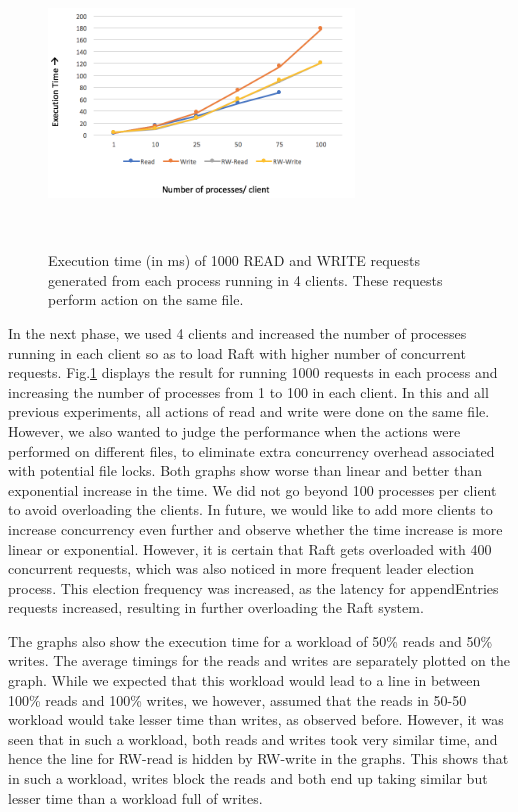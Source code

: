 \begin{figure}
\centering
\includegraphics[height=2in, width=3.2in]{images/F-VHC-SF.png}
\caption{Execution time (in ms) of 1000 READ and WRITE requests generated from each process running in 4 clients. These requests perform action on the same file.}~\label{fig:figure5}
\end{figure}

In the next phase, we used 4 clients and increased the number of processes running in each client so as to load Raft with higher number of concurrent requests. Fig.\ref{fig:figure5} displays the result for running 1000 requests in each process and increasing the number of processes from 1 to 100 in each client. In this and all previous experiments, all actions of read and write were done on the same file. However, we also wanted to judge the performance when the actions were performed on different files, to eliminate extra concurrency overhead associated with potential file locks. Both graphs show worse than linear and better than exponential increase in the time. We did not go beyond 100 processes per client to avoid overloading the clients. In future, we would like to add more clients to increase concurrency even further and observe whether the time increase is more linear or exponential. However, it is certain that Raft gets overloaded with 400 concurrent requests, which was also noticed in more frequent leader election process. This election frequency was increased, as the latency for appendEntries requests increased, resulting in further overloading the Raft system. 

The graphs also show the execution time for a workload of 50\% reads and 50\% writes. The average timings for the reads and writes are separately plotted on the graph. While we expected that this workload would lead to a line in between 100\% reads and 100\% writes, we however, assumed that the reads in 50-50 workload would take lesser time than writes, as observed before. However, it was seen that in such a workload, both reads and writes took very similar time, and hence the line for RW-read is hidden by RW-write in the graphs. This shows that in such a workload, writes block the reads and both end up taking similar but lesser time than a workload full of writes. 


